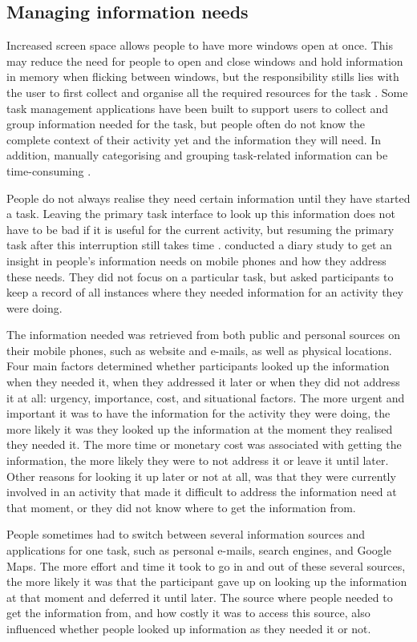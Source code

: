 \subsection{Managing information needs}
Increased screen space allows people to have more windows open at once. This may reduce the need for people to open and close windows and hold information in memory when flicking between windows, but the responsibility stills lies with the user to first collect and organise all the required resources for the task \citep{Bardram2006}. Some task management applications have been built to support users to collect and group information needed for the task, but people often do not know the complete context of their activity yet and the information they will need. In addition, manually categorising and grouping task-related information can be time-consuming \citep{Cangiano2009}.

People do not always realise they need certain information until they have started a task. Leaving the primary task interface to look up this information does not have to be bad if it is useful for the current activity, but resuming the primary task after this interruption still takes time \citep{Rule2013}.
\citet{Sohn2008} conducted a diary study to get an insight in people's information needs on mobile phones and how they address these needs. They did not focus on a particular task, but asked participants to keep a record of all instances where they needed information for an activity they were doing.

The information needed was retrieved from both public and personal sources on their mobile phones, such as website and e-mails, as well as physical locations. Four main factors determined whether participants looked up the information when they needed it, when they addressed it later or when they did not address it at all: urgency, importance, cost, and situational factors. The more urgent and important it was to have the information for the activity they were doing, the more likely it was they looked up the information at the moment they realised they needed it. The more time or monetary cost was associated with getting the information, the more likely they were to not address it or leave it until later. Other reasons for looking it up later or not at all, was that they were currently involved in an activity that made it difficult to address the information need at that moment, or they did not know where to get the information from.

People sometimes had to switch between several information sources and applications for one task, such as personal e-mails, search engines, and Google Maps. The more effort and time it took to go in and out of these several sources, the more likely it was that the participant gave up on looking up the information at that moment and deferred it until later. The source where people needed to get the information from, and how costly it was to access this source, also influenced whether people looked up information as they needed it or not.

